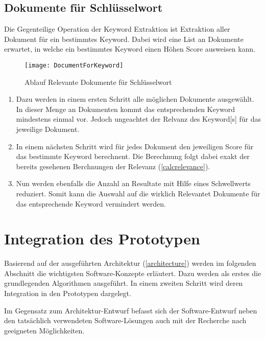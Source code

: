 \subsection{Dokumente für Schlüsselwort}
Die Gegenteilige Operation der \gls{Keyword} Extraktion ist Extraktion aller Dokument für ein bestimmtes  \gls{Keyword}. Dabei wird eine List an Dokumente erwartet, in welche ein bestimmtes \gls{Keyword} einen Höhen Score ausweisen kann. 

    \begin{figure}[H]
    \centering
    \texttt{[image: DocumentForKeyword]}
    \caption{Ablauf Relevante Dokumente für Schlüsselwort}
    \label{fig:seqdocforkeyword}
    \end{figure}
\begin{enumerate}
    \item  Dazu werden in einem ersten Schritt alle möglichen Dokumente ausgewählt. In dieser Menge an Dokumenten kommt das entsprechenden \gls{Keyword} mindestens einmal vor. Jedoch ungeachtet der Relvanz des \gls{Keyword}[s] für das jeweilige Dokument.
    \item In einem nächsten Schritt wird für jedes Dokument den jeweiligen Score für das bestimmte \gls{Keyword} berechnent. Die Berechnung folgt dabei exakt der bereits gesehenen Berchnungen der Relevanz (\autoref{calcrelevance}).

    \item Nun werden ebenfalls die Anzahl an Resultate mit Hilfe eines Schwellwerts reduziert. Somit kann die Auswahl auf die wirklich Relevantet Dokumente für das entsprechende \gls{Keyword} vermindert werden.
            
\end{enumerate}








\section{Integration des Prototypen}
Basierend auf der ausgeführten Architektur (\autoref{architecture}) werden im folgenden Abschnitt die wichtigsten Software-Konzepte erläutert. Dazu werden als erstes die grundlegenden Algorithmen ausgeführt. In einem zweiten Schritt wird deren Integration in den Prototypen dargelegt.

Im Gegensatz zum Architektur-Entwurf befasst sich der Software-Entwurf neben den tatsächlich verwendeten Software-Lösungen auch mit der Recherche nach geeigneten Möglichkeiten.

